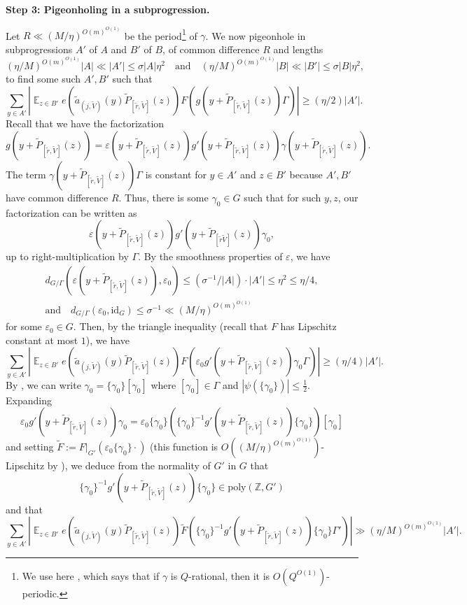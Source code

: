 \documentclass[11pt]{amsart}
\theoremstyle{definition}
\DeclareMathOperator*{\E}{\mathbb{E}}
\newcommand{\abs}[1]{\mathopen{}\left| #1\mathclose{}\right|}
\begin{document}
\smallskip
\textbf{Step 3: Pigeonholing in a subprogression.}
\smallskip

Let $R \ll (M/\eta)^{O(m)^{O(1)}}$ be the period\footnote{We use here \cite[Lemma B.14]{Leng23b}, which says that if $\gamma$ is $Q$-rational, then it is $O(Q^{O(1)})$-periodic.} of $\gamma$. We now pigeonhole in subprogressions $A'$ of $A$ and $B'$ of $B$, of common difference $R$ and lengths
$$(\eta/M)^{O(m)^{O(1)}}|A| \ll |A'| \leq \sigma |A|\eta^{2} \quad \text{and} \quad (\eta/M)^{O(m)^{O(1)}}|B| \ll |B'| \leq \sigma |B|\eta^{2},$$
to find some such $A',B'$ such that
$$\sum_{y \in A'} \abs{\E_{z \in B'}e(\tilde{a}_{(j, \tilde{V})}(y)\widetilde{P}_{[\tilde{r}, \tilde{V}]}(z))F(g(y + \widetilde{P}_{[\tilde{r}, \tilde{V}]}(z))\Gamma)} \geq (\eta/2) |A'|.$$
Recall that we have the factorization 
$$g(y + \widetilde{P}_{[\tilde{r}, \tilde{V}]}(z)) = \varepsilon(y + \widetilde{P}_{[\tilde{r}, \tilde{V}]}(z))g'(y + \widetilde{P}_{[\tilde{r}, \tilde{V}]}(z))\gamma(y + \widetilde{P}_{[\tilde{r}, \tilde{V}]}(z)).$$
The term  $\gamma(y + \widetilde{P}_{[\tilde{r}, \tilde{V}]}(z))\Gamma$ is constant for $y \in A'$ and $z \in B'$ because $A',B'$ have common difference $R$.  Thus, there is some $\gamma_0 \in G$ such that for such $y,z$, our factorization can be written as
$$\varepsilon(y + \widetilde{P}_{[\tilde{r}, \tilde{V}]}(z))g'(y + \widetilde{P}_{[\tilde{r} \tilde{V}]}(z))\gamma_0,$$
up to right-multiplication by $\Gamma$. By the smoothness properties of $\varepsilon$, we have
\begin{gather*}
d_{G/\Gamma}(\varepsilon(y + \widetilde{P}_{[\tilde{r}, \tilde{V}]}(z)), \varepsilon_0) \leq \left(\sigma^{-1}/|A|\right) \cdot |A'| \leq \eta^2 \leq \eta/4,\\
\textrm{and}\quad d_{G/\Gamma}(\varepsilon_0, \mathrm{id}_G) \leq \sigma^{-1}\ll (M/\eta)^{O(m)^{O(1)}}
\end{gather*}
for some $\varepsilon_0 \in G$. Then, by the triangle inequality (recall that $F$ has Lipschitz constant at most $1$), we have
$$\sum_{y \in A'} \abs{\E_{z \in B'}e(\tilde{a}_{(j, \tilde{V})}(y)\widetilde{P}_{[\tilde{r}, \tilde{V}]}(z))F(\varepsilon_0 g'(y + \widetilde{P}_{[\tilde{r}, \tilde{V}]}(z))\gamma_0\Gamma)} \geq (\eta/4) |A'|.$$
By \cite[Lemma B.6]{Leng23b}, we can write $\gamma_0 = \{\gamma_0\}[\gamma_0]$ where $[\gamma_0] \in \Gamma$ and $|\psi(\{\gamma_0\})| \le \frac{1}{2}$. Expanding
$$\varepsilon_0 g'(y + \widetilde{P}_{[\tilde{r}, \tilde{V}]}(z))\gamma_0 = \varepsilon_0 \{\gamma_0\} (\{\gamma_0\}^{-1}g'(y + \widetilde{P}_{[\tilde{r}, \tilde{V}]}(z))\{\gamma_0\})[\gamma_0]$$ and setting
$\tilde{F} := F|_{G'}(\varepsilon_0 \{\gamma_0\} \cdot)$ (this function is $O((M/\eta)^{O(m)^{O(1)}})$-Lipschitz by \cite[Lemma B.4]{Leng23b}), we deduce from the normality of $G'$ in $G$ that $$\{\gamma_0\}^{-1}g'(y + \widetilde{P}_{[\tilde{r}, \tilde{V}]}(z))\{\gamma_0\} \in \mathrm{poly}(\mathbb{Z}, G')$$ and that
$$\sum_{y \in A'} \abs{\E_{z \in B'}e(\tilde{a}_{(j, \tilde{V})}(y)\widetilde{P}_{[\tilde{r}, \tilde{V}]}(z))\tilde{F}(\{\gamma_0\}^{-1}g'(y + \widetilde{P}_{[\tilde{r}, \tilde{V}]}(z))\{\gamma_0\}\Gamma')}\gg (\eta/M)^{O(m)^{O(1)}} |A'|.$$
\end{document}
